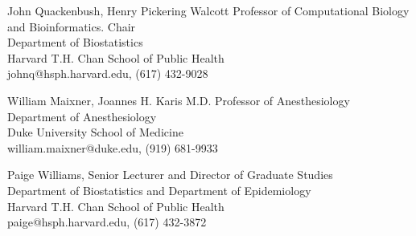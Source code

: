 \documentclass[10pt]{article}
\begin{document}
\indent \indent John Quackenbush, Henry Pickering Walcott Professor of Computational Biology and Bioinformatics. Chair\\
\indent \indent Department of Biostatistics\\
\indent \indent Harvard T.H. Chan School of Public Health\\
\indent \indent johnq@hsph.harvard.edu, (617) 432-9028
\vspace{0.35cm}

\indent \indent William Maixner, Joannes H. Karis M.D. Professor of Anesthesiology\\
\indent \indent Department of Anesthesiology\\
\indent \indent Duke University School of Medicine \\
\indent \indent william.maixner@duke.edu, (919) 681-9933
\vspace{0.35cm}

\indent \indent Paige Williams, Senior Lecturer and Director of Graduate Studies\\
\indent \indent Department of Biostatistics and Department of Epidemiology\\
\indent \indent Harvard T.H. Chan School of Public Health\\
\indent \indent paige@hsph.harvard.edu, (617) 432-3872\\
\end{document}
